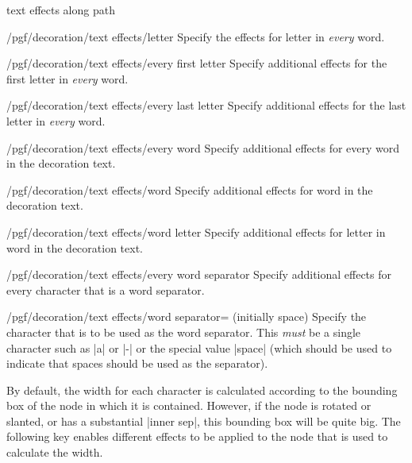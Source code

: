 \begin{decoration}{text effects along path}
    \begin{stylekey}{/pgf/decoration/text effects/letter }
        Specify the effects for letter  in \emph{every} word.
    \end{stylekey}


\begin{stylekey}{/pgf/decoration/text effects/every first letter}
    Specify additional effects for the first letter in \emph{every} word.
\end{stylekey}

\begin{stylekey}{/pgf/decoration/text effects/every last letter}
    Specify additional effects for the last letter in \emph{every} word.
\end{stylekey}

\begin{stylekey}{/pgf/decoration/text effects/every word}
    Specify additional effects for every word in the decoration text.
\end{stylekey}

\begin{stylekey}{/pgf/decoration/text effects/word }
    Specify additional effects for word  in the decoration text.
\end{stylekey}

\begin{stylekey}{/pgf/decoration/text effects/word  letter }
    Specify additional effects for letter  in word  in the
    decoration text.
\end{stylekey}

\begin{stylekey}{/pgf/decoration/text effects/every word separator}
    Specify additional effects for every character that is a word separator.
\end{stylekey}

\begin{key}{/pgf/decoration/text effects/word separator= (initially space)}
    Specify the character that is to be used as the word separator. This
    \emph{must} be a single character such as |a| or |-| or the special value
    |space| (which should be used to indicate that spaces should be used as the
    separator).
\end{key}

    By default, the width for each character is calculated according to the
    bounding box of the node in which it is contained. However, if the node is
    rotated or slanted, or has a substantial |inner sep|, this bounding box
    will be quite big. The following key enables different effects to be
    applied to the node that is used to calculate the width.


\end{decoration}
